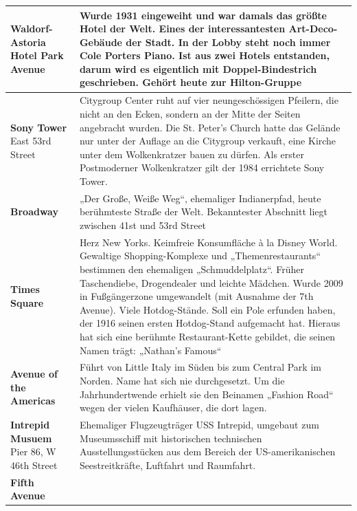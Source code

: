 \documentclass[fontsize=14pt,a4paper,headinclude,DIV=calc,automark]{scrbook}
\begin{document}
{\begin{longtable}{
    >{\raggedright\arraybackslash\columncolor{tablecellblue}}p{5.1cm}
    >{\raggedright\arraybackslash\columncolor{rightcolumn}}p{10cm}
    }
    \textbf{Waldorf-Astoria Hotel}\newline
    Park Avenue & Wurde 1931 eingeweiht und war damals das größte Hotel der Welt. Eines der interessantesten Art-Deco-Gebäude der Stadt. In der Lobby steht noch immer Cole Porters Piano. Ist aus zwei Hotels entstanden, darum wird es eigentlich mit Doppel-Bindestrich geschrieben. Gehört heute zur Hilton-Gruppe \\ \midrule
    \textbf{Sony Tower}\newline
    153 East 53rd Street & Citygroup Center ruht auf vier neungeschössigen Pfeilern, die nicht an den Ecken, sondern an der Mitte der Seiten angebracht wurden. Die St. Peter’s Church hatte das Gelände nur unter der Auflage an die Citygroup verkauft, eine Kirche unter dem Wolkenkratzer bauen zu dürfen. Als erster Postmoderner Wolkenkratzer gilt der 1984 errichtete Sony Tower. \\ \midrule
    \textbf{Broadway}\newline
     & „Der Große, Weiße Weg“, ehemaliger Indianerpfad, heute berühmteste Straße der Welt. Bekanntester Abschnitt liegt zwischen 41st und 53rd Street \\ \midrule
    \textbf{Times Square}\newline
     & Herz New Yorks. Keimfreie Konsumfläche à la Disney World. Gewaltige Shopping-Komplexe und „Themenrestaurants“ bestimmen den ehemaligen „Schmuddelplatz“. Früher Taschendiebe, Drogendealer und leichte Mädchen. Wurde 2009 in Fußgängerzone umgewandelt (mit Ausnahme der 7th Avenue). Viele Hotdog-Stände. Soll ein Pole erfunden haben, der 1916 seinen ersten Hotdog-Stand aufgemacht hat. Hieraus hat sich eine berühmte Restaurant-Kette gebildet, die seinen Namen trägt: „Nathan’s Famous“ \\ \midrule
    \textbf{Avenue of the Americas}\newline
     & Führt von Little Italy im Süden bis zum Central Park im Norden. Name hat sich nie durchgesetzt. Um die Jahrhundertwende erhielt sie den Beinamen „Fashion Road“ wegen der vielen Kaufhäuser, die dort lagen. \\ \midrule
    \textbf{Intrepid Musuem}\newline
    Pier 86, W 46th Street & Ehemaliger Flugzeugträger USS Intrepid, umgebaut zum Museumsschiff mit historischen technischen Ausstellungsstücken aus dem Bereich der US-amerikanischen Seestreitkräfte, Luftfahrt und Raumfahrt. \\ \midrule
    \textbf{Fifth Avenue}\newline

\end{longtable}}
\end{document}
